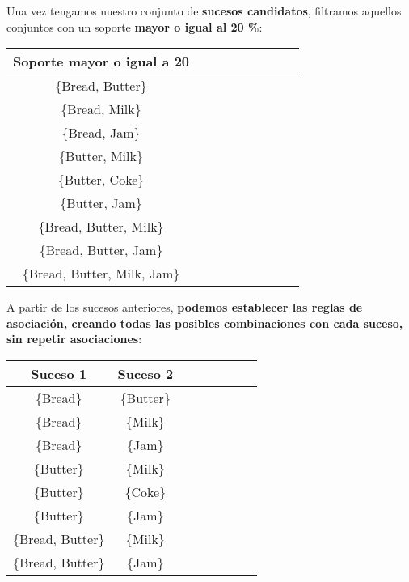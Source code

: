 \documentclass [a4paper] {article}
\begin{document}
Una vez tengamos nuestro conjunto de \textbf{sucesos candidatos}, filtramos aquellos conjuntos con un soporte \textbf{mayor o igual al 20 \%}:
\begin{center}
\begin{tabular}{|c|c|c|c|c|c|c|c|c|}
\hline
Soporte mayor o igual a 20              \\ \hline
\{Bread, Butter\}                       \\ \hline
\{Bread, Milk\}                         \\ \hline
\{Bread, Jam\}                          \\ \hline
\{Butter, Milk\}                        \\ \hline
\{Butter, Coke\}                        \\ \hline
\{Butter, Jam\}                         \\ \hline
\{Bread, Butter, Milk\}                 \\ \hline
\{Bread, Butter, Jam\}                  \\ \hline
\{Bread, Butter, Milk, Jam\}            \\ \hline
\end{tabular}
\end{center}

A partir de los sucesos anteriores, \textbf{podemos establecer las reglas de asociación, creando todas las posibles combinaciones con cada suceso, sin repetir asociaciones}:
\begin{center}
\begin{tabular}{|c|c|c|c|c|c|c|c|}
\hline
Suceso 1           & Suceso 2                        \\ \hline
\{Bread\}          & \{Butter\}                      \\ \hline
\{Bread\}          & \{Milk\}                        \\ \hline
\{Bread\}          & \{Jam\}                         \\ \hline
\{Butter\}         & \{Milk\}                        \\ \hline
\{Butter\}         & \{Coke\}                        \\ \hline
\{Butter\}         & \{Jam\}                         \\ \hline
\{Bread, Butter\}  & \{Milk\}                        \\ \hline
\{Bread, Butter\}  & \{Jam\}                         \\ \hline
\end{tabular}
\end{center}
\end{document}
